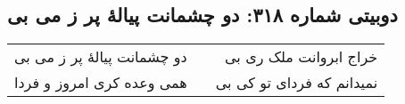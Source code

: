 \begin{center}
\section*{دوبیتی شماره ۳۱۸: دو چشمانت پیالهٔ پر ز می بی}
\label{sec:318}
\begin{longtable}{l p{0.5cm} r}
دو چشمانت پیالهٔ پر ز می بی
&&
خراج ابروانت ملک ری بی
\\
همی وعده کری امروز و فردا
&&
نمیدانم که فردای تو کی بی
\\
\end{longtable}
\end{center}
